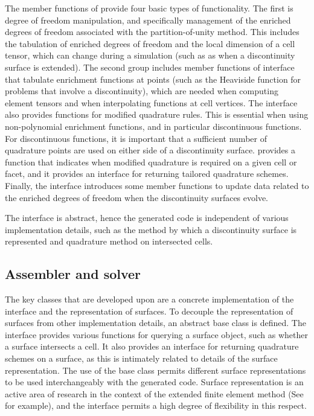 The member functions of  provide four basic types
of functionality. The first is degree of freedom manipulation, and
specifically management of the enriched degrees of freedom associated
with the partition-of-unity method.  This includes the tabulation of
enriched degrees of freedom and the local dimension of a cell tensor,
which can change during a simulation (such as as when a discontinuity
surface is extended). The second group includes member functions
of  interface that tabulate enrichment functions at
points (such as the Heaviside function for problems that involve a
discontinuity), which are needed when computing element tensors and
when interpolating functions at cell vertices. The 
interface also provides functions for modified quadrature rules. This
is essential when using non-polynomial enrichment functions, and in
particular discontinuous functions. For discontinuous functions, it is
important that a sufficient number of quadrature points are used on either
side of a discontinuity surface.  provides a function
that indicates when modified quadrature is required on a given cell or
facet, and it provides an interface for returning tailored quadrature
schemes. Finally, the  interface introduces some member
functions to update data related to the enriched degrees of freedom when
the discontinuity surfaces evolve.

The  interface is abstract, hence the generated code is
independent of various implementation details, such as the method by
which a discontinuity surface is represented and quadrature method on
intersected cells.

\subsection{Assembler and solver}

The key classes that are developed upon \dolfin{} are a concrete
implementation of the  interface and the representation
of surfaces. To decouple the representation of surfaces from other
implementation details, an abstract base class  is
defined. The  interface provides various functions
for querying a surface object, such as whether a surface intersects
a cell.  It also provides an interface for returning quadrature
schemes on a surface, as this is intimately related to details of the
surface representation.  The use of the base class 
permits different surface representations to be used interchangeably
with the generated code. Surface representation is an active area
of research in the context of the extended finite element method (See
\citep{JagerSteinmannKuhl2008} for example), and the 
interface permits a high degree of flexibility in this respect.

